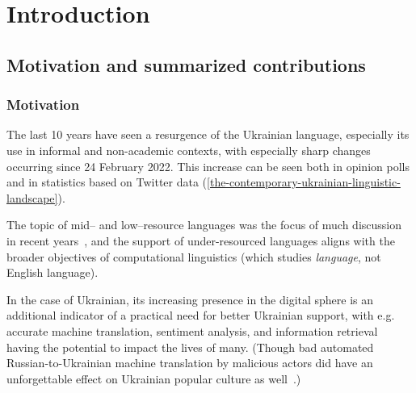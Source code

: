 \chapter{Introduction}\label{ch:introduction}




\section{Motivation and summarized contributions}
\subsection{Motivation}
The last 10 years have seen a resurgence of the Ukrainian language,
especially its use in informal and non-academic contexts, with especially sharp changes occurring since 24 February 2022.
This increase can be seen both in opinion polls and in statistics based on Twitter data (\autoref{the-contemporary-ukrainian-linguistic-landscape}).

The topic of mid– and low–resource languages was the focus of much discussion in recent years~\cite{inclusion}, and the support of under-resourced languages aligns with the broader objectives of computational linguistics (which studies \textit{language}, not English language).

In the case of Ukrainian, its increasing presence in the digital sphere is an additional indicator of a practical need for better Ukrainian support, with e.g. accurate machine translation, sentiment analysis, and information retrieval having the potential to impact the lives of many. 
(Though bad automated Russian-to-Ukrainian machine translation by malicious actors did have an unforgettable effect on Ukrainian popular culture as well~\cite{faichuk2023war}.)

